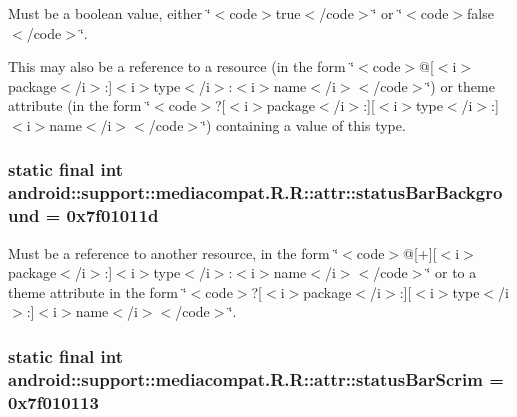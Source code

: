 Must be a boolean value, either \char`\"{}$<$code$>$true$<$/code$>$\char`\"{} or \char`\"{}$<$code$>$false$<$/code$>$\char`\"{}. 

This may also be a reference to a resource (in the form \char`\"{}$<$code$>$@\mbox{[}$<$i$>$package$<$/i$>$:\mbox{]}$<$i$>$type$<$/i$>$:$<$i$>$name$<$/i$>$$<$/code$>$\char`\"{}) or theme attribute (in the form \char`\"{}$<$code$>$?\mbox{[}$<$i$>$package$<$/i$>$:\mbox{]}\mbox{[}$<$i$>$type$<$/i$>$:\mbox{]}$<$i$>$name$<$/i$>$$<$/code$>$\char`\"{}) containing a value of this type. \hypertarget{classandroid_1_1support_1_1mediacompat_1_1_r_1_1attr_9b003c576065f37fc45fa9dd46e17a5b}{
\subsubsection[{statusBarBackground}]{\setlength{\rightskip}{0pt plus 5cm}static final int android::support::mediacompat.R.R::attr::statusBarBackground = 0x7f01011d}}
\label{classandroid_1_1support_1_1mediacompat_1_1_r_1_1attr_9b003c576065f37fc45fa9dd46e17a5b}


Must be a reference to another resource, in the form \char`\"{}$<$code$>$@\mbox{[}+\mbox{]}\mbox{[}$<$i$>$package$<$/i$>$:\mbox{]}$<$i$>$type$<$/i$>$:$<$i$>$name$<$/i$>$$<$/code$>$\char`\"{} or to a theme attribute in the form \char`\"{}$<$code$>$?\mbox{[}$<$i$>$package$<$/i$>$:\mbox{]}\mbox{[}$<$i$>$type$<$/i$>$:\mbox{]}$<$i$>$name$<$/i$>$$<$/code$>$\char`\"{}. \hypertarget{classandroid_1_1support_1_1mediacompat_1_1_r_1_1attr_46063e5b0649a47d888a9a088763397f}{
\subsubsection[{statusBarScrim}]{\setlength{\rightskip}{0pt plus 5cm}static final int android::support::mediacompat.R.R::attr::statusBarScrim = 0x7f010113}}
\label{classandroid_1_1support_1_1mediacompat_1_1_r_1_1attr_46063e5b0649a47d888a9a088763397f}


